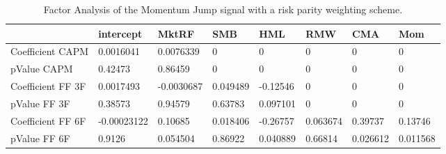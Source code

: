 \begin{table}[H]
\centering
\begin{tabular}{llllllll}
& intercept & MktRF & SMB & HML & RMW & CMA & Mom \\ 
\hline 
Coefficient CAPM & 0.0016041 & 0.0076339 & 0 & 0 & 0 & 0 & 0 \\ 
pValue CAPM & 0.42473 & 0.86459 & 0 & 0 & 0 & 0 & 0 \\ 
Coefficient FF 3F & 0.0017493 & -0.0030687 & 0.049489 & -0.12546 & 0 & 0 & 0 \\ 
pValue FF 3F & 0.38573 & 0.94579 & 0.63783 & 0.097101 & 0 & 0 & 0 \\ 
Coefficient FF 6F & -0.00023122 & 0.10685 & 0.018406 & -0.26757 & 0.063674 & 0.39737 & 0.13746 \\ 
pValue FF 6F & 0.9126 & 0.054504 & 0.86922 & 0.040889 & 0.66814 & 0.026612 & 0.011568 \\ 
\hline
\end{tabular}
\caption{Factor Analysis of the Momentum Jump signal with a risk parity weighting scheme.}
\label{MOMJUMPRP_FACTOR}
\end{table}